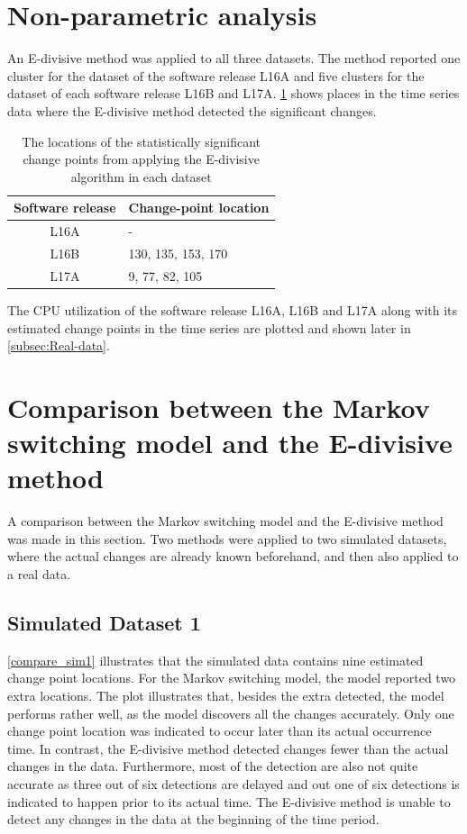 \section{Non-parametric analysis}

An E-divisive method was applied to all three datasets. The method
reported one cluster for the dataset of the software release L16A
and five clusters for the dataset of each software release L16B and
L17A. \ref{ediv} shows places in the time series data where the E-divisive
method detected the significant changes. 

\begin{table}[h]
\caption{The locations of the statistically significant change points from
applying the E-divisive algorithm in each dataset}
\label{ediv}
\centering{}%
\begin{tabular}{cl}
\toprule 
Software release & Change-point location\tabularnewline
\midrule
\midrule 
L16A & -\tabularnewline
L16B & 130, 135, 153, 170\tabularnewline
L17A & 9, 77, 82, 105\tabularnewline
\bottomrule
\end{tabular}
\end{table}

The CPU utilization of the software release L16A, L16B and L17A along
with its estimated change points in the time series are plotted and
shown later in \ref{subsec:Real-data}. 


\section{Comparison between the Markov switching model and the E-divisive
method}

A comparison between the Markov switching model and the E-divisive
method was made in this section. Two methods were applied to two simulated
datasets, where the actual changes are already known beforehand, and
then also applied to a real data.

\subsection{Simulated Dataset 1}

\ref{compare_sim1} illustrates that the simulated data contains nine
estimated change point locations. For the Markov switching model,
the model reported two extra locations. The plot illustrates that,
besides the extra detected, the model performs rather well, as the
model discovers all the changes accurately. Only one change point
location was indicated to occur later than its actual occurrence time.
In contrast, the E-divisive method detected changes fewer than the
actual changes in the data. Furthermore, most of the detection are
also not quite accurate as three out of six detections are delayed
and out one of six detections is indicated to happen prior to its
actual time. The E-divisive method is unable to detect any changes
in the data at the beginning of the time period.

